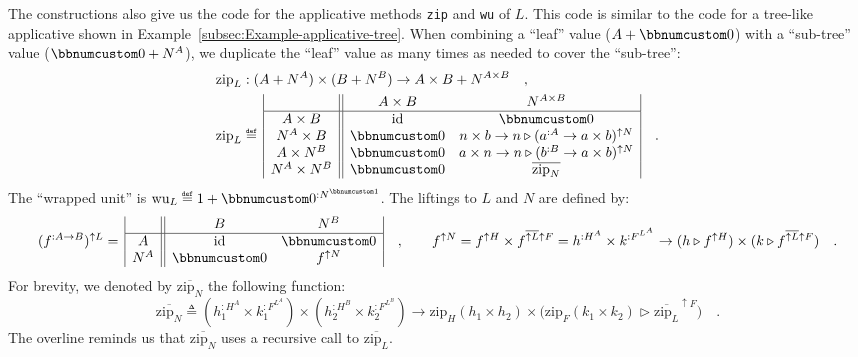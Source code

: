 The constructions also give us the code for the applicative methods
\lstinline!zip! and \lstinline!wu! of $L$. This code is similar
to the code for a tree-like applicative shown in Example~\ref{subsec:Example-applicative-tree}.
When combining a \textsf{``}leaf\textsf{''} value ($A+\bbnum 0$) with a \textsf{``}sub-tree\textsf{''}
value ($\bbnum 0+N^{A}$), we duplicate the \textsf{``}leaf\textsf{''} value as many
times as needed to cover the \textsf{``}sub-tree\textsf{''}:
\begin{align*}
 & \text{zip}_{L}:(A+N^{A})\times(B+N^{B})\rightarrow A\times B+N^{A\times B}\quad,\\
 & \text{zip}_{L}\triangleq\,\begin{array}{|c||cc|}
 & A\times B & N^{A\times B}\\
\hline A\times B & \text{id} & \bbnum 0\\
N^{A}\times B & \bbnum 0 & n\times b\rightarrow n\triangleright(a^{:A}\rightarrow a\times b)^{\uparrow N}\\
A\times N^{B} & \bbnum 0 & a\times n\rightarrow n\triangleright(b^{:B}\rightarrow a\times b)^{\uparrow N}\\
N^{A}\times N^{B} & \bbnum 0 & \overline{\text{zip}_{N}}
\end{array}\quad.
\end{align*}
The \textsf{``}wrapped unit\textsf{''} is $\text{wu}_{L}\triangleq1+\bbnum 0^{:N^{\bbnum 1}}$.
The liftings to $L$ and $N$ are defined by:
\[
(f^{:A\rightarrow B})^{\uparrow L}=\,\begin{array}{|c||cc|}
 & B & N^{B}\\
\hline A & \text{id} & \bbnum 0\\
N^{A} & \bbnum 0 & f^{\uparrow N}
\end{array}\quad,\quad\quad f^{\uparrow N}=f^{\uparrow H}\times f^{\overline{\uparrow L}\uparrow F}=h^{:H^{A}}\times k^{:F^{L^{A}}}\rightarrow(h\triangleright f^{\uparrow H})\times(k\triangleright f^{\overline{\uparrow L}\uparrow F})\quad.
\]
For brevity, we denoted by $\overline{\text{zip}_{N}}$ the following
function:
\[
\overline{\text{zip}_{N}}\triangleq(h_{1}^{:H^{A}}\times k_{1}^{:F^{L^{A}}})\times(h_{2}^{:H^{B}}\times k_{2}^{:F^{L^{B}}})\rightarrow\text{zip}_{H}(h_{1}\times h_{2})\times\big(\text{zip}_{F}(k_{1}\times k_{2})\triangleright\overline{\text{zip}_{L}}^{\uparrow F}\big)\quad.
\]
The overline reminds us that $\overline{\text{zip}_{N}}$ uses a recursive
call to $\overline{\text{zip}_{L}}$. %
